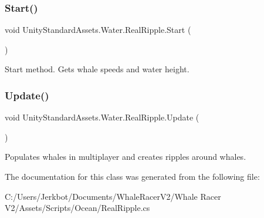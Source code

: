 \subsubsection{\texorpdfstring{Start()}{Start()}}
{\footnotesize\ttfamily void Unity\+Standard\+Assets.\+Water.\+Real\+Ripple.\+Start (\begin{DoxyParamCaption}{ }\end{DoxyParamCaption})\hspace{0.3cm}{\ttfamily [private]}}



Start method. Gets whale speeds and water height. 

\mbox{\label{class_unity_standard_assets_1_1_water_1_1_real_ripple_ae2a081e856692d87b0f4e8e0f8f2861e}} 
\subsubsection{\texorpdfstring{Update()}{Update()}}
{\footnotesize\ttfamily void Unity\+Standard\+Assets.\+Water.\+Real\+Ripple.\+Update (\begin{DoxyParamCaption}{ }\end{DoxyParamCaption})}



Populates whales in multiplayer and creates ripples around whales. 



The documentation for this class was generated from the following file\+:\begin{DoxyCompactItemize}
\item 
C\+:/\+Users/\+Jerkbot/\+Documents/\+Whale\+Racer\+V2/\+Whale Racer V2/\+Assets/\+Scripts/\+Ocean/Real\+Ripple.\+cs\end{DoxyCompactItemize}
